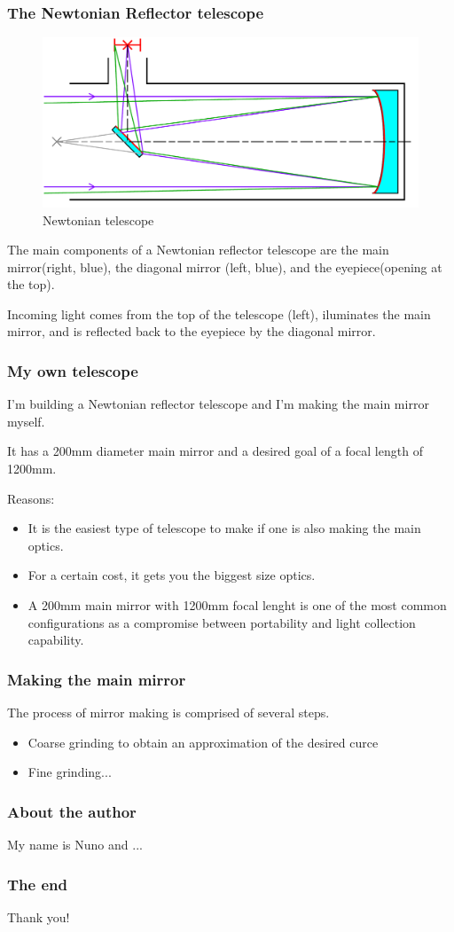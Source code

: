 \documentclass{beamer}
\begin{document}
\begin{frame}
\frametitle{The Newtonian Reflector telescope}
\begin{figure}
\includegraphics[scale=0.3]{assets/Newtonian_telescope2.pdf}
\caption{Newtonian telescope}
\end{figure}
The main components of a Newtonian reflector telescope are the main mirror\footnotemark (right, blue),
the diagonal mirror (left, blue), and the eyepiece\footnotemark (opening at the top).

Incoming light comes from the top of the telescope (left), iluminates the main mirror, and is reflected back to the eyepiece by the diagonal mirror.
\end{frame}

\begin{frame}
\frametitle{My own telescope}
I'm building a Newtonian reflector telescope and I'm making the main mirror myself.

It has a 200mm diameter main mirror and a desired goal of a focal length of 1200mm.

Reasons:
\begin{itemize}
\item It is the easiest type of telescope to make if one is also making the main optics.
\item For a certain cost, it gets you the biggest size optics.
\item A 200mm main mirror with 1200mm focal lenght is one of the most common configurations as a compromise between portability and light collection capability.
\end{itemize}
\end{frame}


\begin{frame}
\frametitle{Making the main mirror}
The process of mirror making is comprised of several steps.

\begin{itemize}
\item Coarse grinding to obtain an approximation of the desired curce
\item Fine grinding...
\end{itemize}
\end{frame}

\begin{frame}
\frametitle{About the author}
My name is Nuno and ...
\end{frame}

\begin{frame}
\frametitle{The end}
Thank you!
\end{frame}
\end{document}
